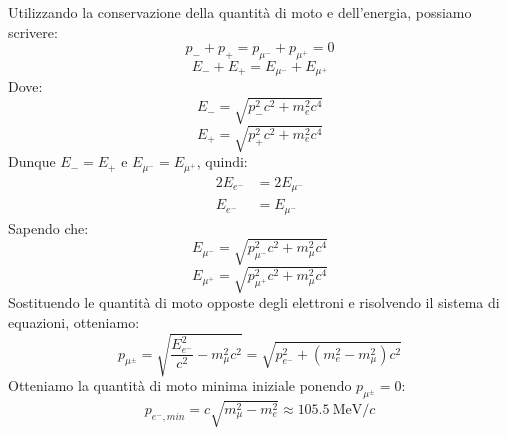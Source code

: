 Utilizzando la conservazione della quantità di moto e dell'energia, possiamo scrivere:
\begin{equation}
 p_- + p_+ = p_{\mu^-} + p_{\mu^+} = 0
\end{equation}
\begin{equation}
 E_- + E_+ = E_{\mu^-} + E_{\mu^+}
\end{equation}
Dove:
\begin{equation}
 E_- = \sqrt{p_-^2 c^2 + m_e^2 c^4}
\end{equation}
\begin{equation}
 E_+ = \sqrt{p_+^2 c^2 + m_e^2 c^4}
\end{equation}
Dunque $E_- = E_+$ e $E_{\mu^-} = E_{\mu^+}$, quindi:
\begin{equation}
 \begin{split}
  2E_{e^-} &= 2E_{\mu^-} \\[8pt]
  E_{e^-} &= E_{\mu^-}
 \end{split}
\end{equation}
Sapendo che:
\begin{equation}
 E_{\mu^-} = \sqrt{p_{\mu^-}^2 c^2 + m_\mu^2 c^4}
\end{equation}
\begin{equation}
 E_{\mu^+} = \sqrt{p_{\mu^+}^2 c^2 + m_\mu^2 c^4}
\end{equation}
Sostituendo le quantità di moto opposte degli elettroni e risolvendo il sistema di equazioni, otteniamo:
\begin{equation}
 p_{\mu^\pm} = \sqrt{\dfrac{E_{e^-}^2}{c^2} - m_\mu^2 c^2} = \sqrt{p_{e^-}^2 + (m_e^2 - m_\mu^2) c^2}
\end{equation}
Otteniamo la quantità di moto minima iniziale ponendo $p_{\mu^\pm} = 0$:
\begin{equation}
 p_{e^-,min} = c \sqrt{m_\mu^2 - m_e^2} \approx \qty{105.5}{\mega\electronvolt\per c}
\end{equation}
